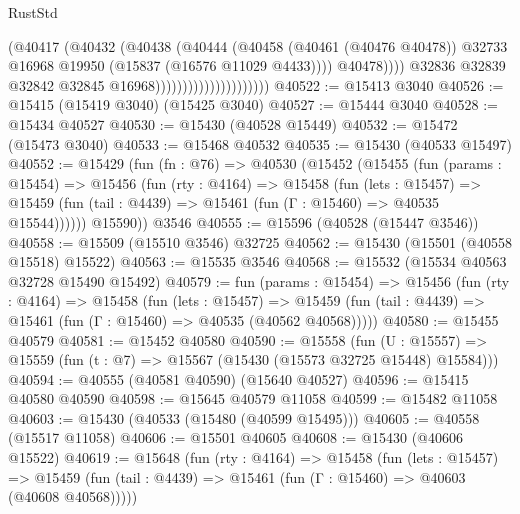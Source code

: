 \begin{lexlean}{RustStd}
\begin{coremodule}
{\begin{coremodule}
{{{{{{{{{{{{{{{{{{{{{{{{{{{{{{{{{{{{{{{{{{{{{{{{{{{{{{{{{{{{                                                (@40417
                                                  (@40432
                                                    (@40438
                                                      (@40444
                                                        (@40458
                                                          (@40461 (@40476 @40478))
                                                          @32733
                                                          @16968
                                                          @19950
                                                          (@15837 (@16576 @11029 @4433))))
                                                      @40478))))
                                              @32836
                                              @32839
                                              @32842
                                              @32845
                                              @16968)))))))))))))))))))))
@40522 := @15413 @3040
@40526 := @15415 (@15419 @3040) (@15425 @3040)
@40527 := @15444 @3040
@40528 := @15434 @40527
@40530 := @15430 (@40528 @15449)
@40532 := @15472 (@15473 @3040)
@40533 := @15468 @40532
@40535 := @15430 (@40533 @15497)
@40552 := @15429
    (fun (fn : @76) =>
    @40530
      (@15452
        (@15455
          (fun (params : @15454) =>
          @15456
            (fun (rty : @4164) =>
            @15458
              (fun (lets : @15457) =>
              @15459 (fun (tail : @4439) => @15461 (fun (Γ : @15460) => @40535 @15544))))))
        @15590))
    @3546
@40555 := @15596 (@40528 (@15447 @3546))
@40558 := @15509 (@15510 @3546) @32725
@40562 := @15430 (@15501 (@40558 @15518) @15522)
@40563 := @15535 @3546
@40568 := @15532 (@15534 @40563 @32728 @15490 @15492)
@40579 := fun (params : @15454) =>
  @15456
    (fun (rty : @4164) =>
    @15458
      (fun (lets : @15457) =>
      @15459 (fun (tail : @4439) => @15461 (fun (Γ : @15460) => @40535 (@40562 @40568)))))
@40580 := @15455 @40579
@40581 := @15452 @40580
@40590 := @15558
    (fun (U : @15557) => @15559 (fun (t : @7) => @15567 (@15430 (@15573 @32725 @15448) @15584)))
@40594 := @40555 (@40581 @40590) (@15640 @40527)
@40596 := @15415 @40580 @40590
@40598 := @15645 @40579 @11058
@40599 := @15482 @11058
@40603 := @15430 (@40533 (@15480 (@40599 @15495)))
@40605 := @40558 (@15517 @11058)
@40606 := @15501 @40605
@40608 := @15430 (@40606 @15522)
@40619 := @15648
    (fun (rty : @4164) =>
    @15458
      (fun (lets : @15457) =>
      @15459 (fun (tail : @4439) => @15461 (fun (Γ : @15460) => @40603 (@40608 @40568)))))
}}}}}}}}}}}}}}}}}}}}}}}}}}}}}}}}}}}}}}}}}}}}}}}}}}}}}}}}}}}}
\end{coremodule}}
\end{coremodule}
\end{lexlean}
